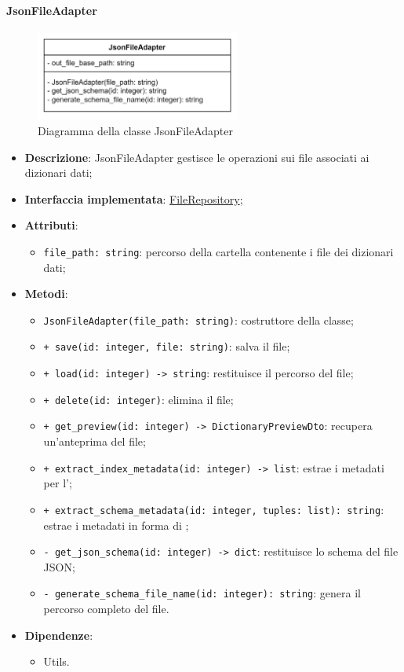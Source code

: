 \paragraph{JsonFileAdapter} \label{JsonFileAdapter}
\begin{figure}[H]
    \centering
    \includegraphics[width=0.6\textwidth]{assets/Backend/json_file_adapter.png}
    \caption{Diagramma della classe JsonFileAdapter}
  \end{figure}
\begin{itemize}
    \item \textbf{Descrizione}: JsonFileAdapter gestisce le operazioni  sui file associati ai dizionari dati;
    \item \textbf{Interfaccia implementata}: \hyperref[FileRepository]{FileRepository};
    \item \textbf{Attributi}:
    \begin{itemize}
        \item \texttt{file\_path: string}: percorso della cartella contenente i file dei dizionari dati;
    \end{itemize}
    \item \textbf{Metodi}:
    \begin{itemize}
        \item \texttt{JsonFileAdapter(file\_path: string)}: costruttore della classe;
        \item \texttt{+ save(id: integer, file: string)}: salva il file;
        \item \texttt{+ load(id: integer) -> string}: restituisce il percorso del file;
        \item \texttt{+ delete(id: integer)}: elimina il file;
        \item \texttt{+ get\_preview(id: integer) -> DictionaryPreviewDto}: recupera un'anteprima del file;
        \item \texttt{+ extract\_index\_metadata(id: integer) -> list}: estrae i metadati per l';
        \item \texttt{+ extract\_schema\_metadata(id: integer, tuples: list): string}: estrae i metadati in forma di ;
        \item \texttt{- get\_json\_schema(id: integer) -> dict}: restituisce lo schema del file JSON;
        \item \texttt{- generate\_schema\_file\_name(id: integer): string}: genera il percorso completo del file.
    \end{itemize}
    \item \textbf{Dipendenze}:
    \begin{itemize}
        \item Utils.
    \end{itemize}
\end{itemize} 